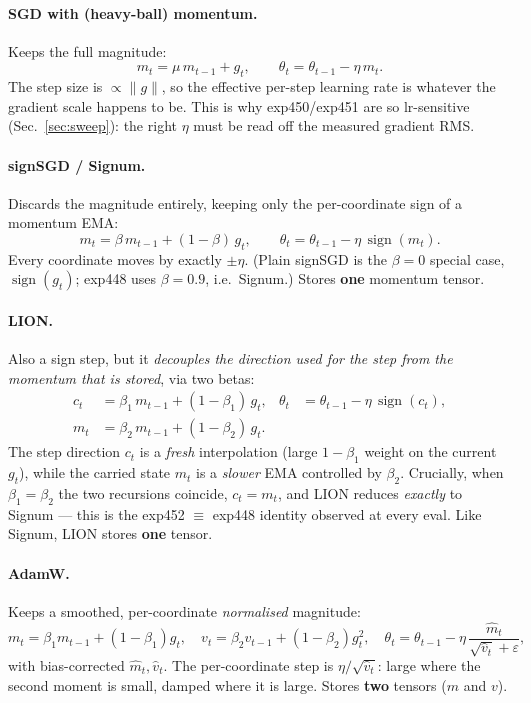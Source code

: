 \documentclass[11pt]{article}
\newcommand{\sign}{\operatorname{sign}}
\begin{document}
\paragraph{SGD with (heavy-ball) momentum.} Keeps the full magnitude:
\begin{equation}
m_t = \mu\, m_{t-1} + g_t,
\qquad
\theta_t = \theta_{t-1} - \eta\, m_t .
\end{equation}
The step size is $\propto \lVert g\rVert$, so the effective per-step learning
rate is whatever the gradient scale happens to be. This is why
exp450/exp451 are so lr-sensitive (Sec.~\ref{sec:sweep}): the right $\eta$
must be read off the measured gradient RMS.

\paragraph{signSGD / Signum.} Discards the magnitude entirely, keeping only
the per-coordinate sign of a momentum EMA:
\begin{equation}
m_t = \beta\, m_{t-1} + (1-\beta)\, g_t,
\qquad
\theta_t = \theta_{t-1} - \eta\, \sign(m_t) .
\end{equation}
Every coordinate moves by exactly $\pm\eta$. (Plain signSGD is the
$\beta\!=\!0$ special case, $\sign(g_t)$; exp448 uses $\beta=0.9$, i.e.\
Signum.) Stores \textbf{one} momentum tensor.

\paragraph{LION.} Also a sign step, but it \emph{decouples the direction
used for the step from the momentum that is stored}, via two betas:
\begin{align}
c_t &= \beta_1\, m_{t-1} + (1-\beta_1)\, g_t, &
\theta_t &= \theta_{t-1} - \eta\, \sign(c_t), \\
m_t &= \beta_2\, m_{t-1} + (1-\beta_2)\, g_t . &&
\end{align}
The step direction $c_t$ is a \emph{fresh} interpolation (large $1-\beta_1$
weight on the current $g_t$), while the carried state $m_t$ is a
\emph{slower} EMA controlled by $\beta_2$. Crucially, when
$\beta_1=\beta_2$ the two recursions coincide, $c_t=m_t$, and LION reduces
\emph{exactly} to Signum --- this is the exp452 $\equiv$ exp448 identity
observed at every eval. Like Signum, LION stores \textbf{one} tensor.

\paragraph{AdamW.} Keeps a smoothed, per-coordinate \emph{normalised}
magnitude:
\begin{equation}
m_t = \beta_1 m_{t-1} + (1-\beta_1) g_t,\quad
v_t = \beta_2 v_{t-1} + (1-\beta_2) g_t^{2},\quad
\theta_t = \theta_{t-1} - \eta\,\frac{\hat m_t}{\sqrt{\hat v_t}+\varepsilon},
\end{equation}
with bias-corrected $\hat m_t,\hat v_t$. The per-coordinate step is
$\eta/\sqrt{\hat v_t}$: large where the second moment is small, damped where
it is large. Stores \textbf{two} tensors ($m$ and $v$).
\end{document}
